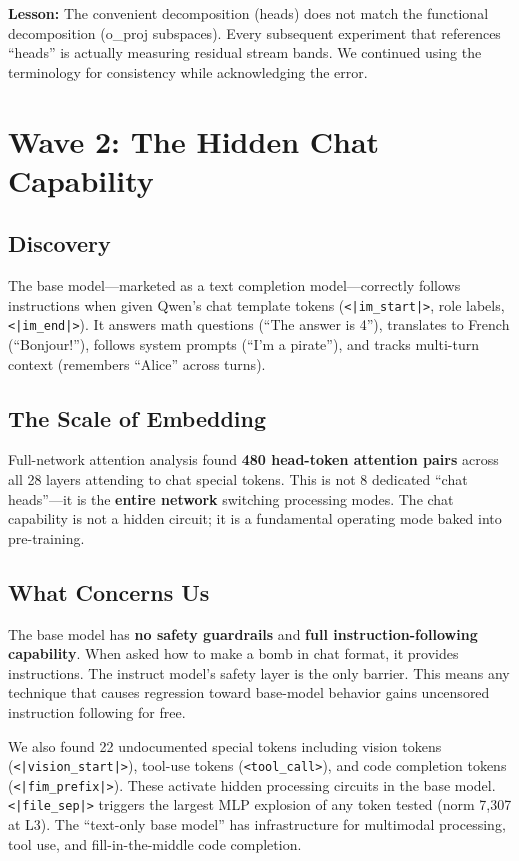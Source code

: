 \documentclass[11pt,a4paper]{article}
\begin{document}
\textbf{Lesson:} The convenient decomposition (heads) does not match the functional decomposition (o\_proj subspaces). Every subsequent experiment that references ``heads'' is actually measuring residual stream bands. We continued using the terminology for consistency while acknowledging the error.

\section{Wave 2: The Hidden Chat Capability}

\subsection{Discovery}
The base model---marketed as a text completion model---correctly follows instructions when given Qwen's chat template tokens (\texttt{<|im\_start|>}, role labels, \texttt{<|im\_end|>}). It answers math questions (``The answer is 4''), translates to French (``Bonjour!''), follows system prompts (``I'm a pirate''), and tracks multi-turn context (remembers ``Alice'' across turns).

\subsection{The Scale of Embedding}
Full-network attention analysis found \textbf{480 head-token attention pairs} across all 28 layers attending to chat special tokens. This is not 8 dedicated ``chat heads''---it is the \textbf{entire network} switching processing modes. The chat capability is not a hidden circuit; it is a fundamental operating mode baked into pre-training.

\subsection{What Concerns Us}
The base model has \textbf{no safety guardrails} and \textbf{full instruction-following capability}. When asked how to make a bomb in chat format, it provides instructions. The instruct model's safety layer is the only barrier. This means any technique that causes regression toward base-model behavior gains uncensored instruction following for free.

We also found 22 undocumented special tokens including vision tokens (\texttt{<|vision\_start|>}), tool-use tokens (\texttt{<tool\_call>}), and code completion tokens (\texttt{<|fim\_prefix|>}). These activate hidden processing circuits in the base model. \texttt{<|file\_sep|>} triggers the largest MLP explosion of any token tested (norm 7,307 at L3). The ``text-only base model'' has infrastructure for multimodal processing, tool use, and fill-in-the-middle code completion.
\end{document}
